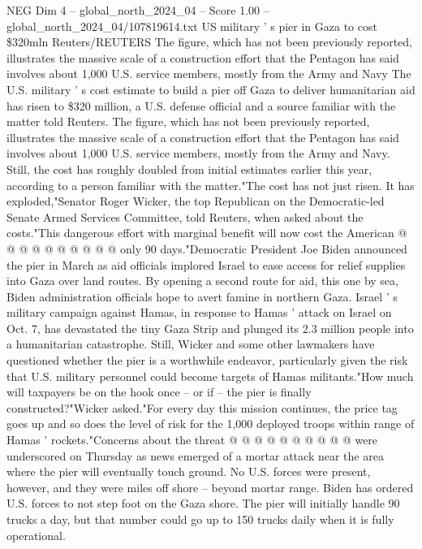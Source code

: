 \begin{textsample}{NEG Dim 4 – global\_north\_2024\_04 – Score 1.00 – global\_north\_2024\_04/107819614.txt}  \label{ex:f4_neg_099}
US military ' s pier in Gaza to cost \$320mln Reuters/REUTERS The figure, which has not been previously reported, illustrates the massive scale of a construction effort that the Pentagon has said involves about 1,000 U.S. service members, mostly from the Army and Navy The U.S. military ' s cost estimate to build a pier off Gaza to deliver humanitarian aid has risen to \$320 million, a U.S. defense official and a source familiar with the matter told Reuters.
The figure, which has not been previously reported, illustrates the massive scale of a construction effort that the Pentagon has said involves about 1,000 U.S. service members, mostly from the Army and Navy.
Still, the cost has roughly doubled from initial estimates earlier this year, according to a person familiar with the matter."The cost has not just risen.
It has exploded,"Senator Roger Wicker, the top Republican on the Democratic-led Senate Armed Services Committee, told Reuters, when asked about the costs."This dangerous effort with marginal benefit will now cost the American @ @ @ @ @ @ @ @ @ @ only 90 days."Democratic President Joe Biden announced the pier in March as aid officials implored Israel to ease access for relief supplies into Gaza over land routes.
By opening a second route for aid, this one by sea, Biden administration officials hope to avert famine in northern Gaza.
Israel ' s military campaign against Hamas, in response to Hamas ' attack on Israel on Oct. 7, has devastated the tiny Gaza Strip and plunged its 2.3 million people into a humanitarian catastrophe.
Still, Wicker and some other lawmakers have questioned whether the pier is a worthwhile endeavor, particularly given the risk that U.S. military personnel could become targets of Hamas militants."How much will taxpayers be on the hook once -- or if -- the pier is finally constructed?"Wicker asked."For every day this mission continues, the price tag goes up and so does the level of risk for the 1,000 deployed troops within range of Hamas ' rockets."Concerns about the threat @ @ @ @ @ @ @ @ @ @ were underscored on Thursday as news emerged of a mortar attack near the area where the pier will eventually touch ground.
No U.S. forces were present, however, and they were miles off shore -- beyond mortar range.
Biden has ordered U.S. forces to not step foot on the Gaza shore.
The pier will initially handle 90 trucks a day, but that number could go up to 150 trucks daily when it is fully operational.

\end{textsample}
